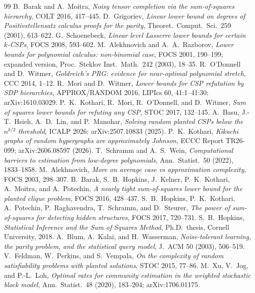 \documentclass[11pt]{article}
\theoremstyle{definition}
\theoremstyle{remark}
\newcommand{\1}{\mathbf 1}
\numberwithin{equation}{section}
\begin{document}
\begin{thebibliography}{99}
 B.~Barak and A.~Moitra, \emph{Noisy tensor completion via the sum-of-squares hierarchy}, COLT 2016, 417--445.
 D.~Grigoriev, \emph{Linear lower bound on degrees of Positivstellensatz calculus proofs for the parity}, Theoret.\ Comput.\ Sci.\ 259 (2001), 613--622.
 G.~Schoenebeck, \emph{Linear level Lasserre lower bounds for certain $k$-CSPs}, FOCS 2008, 593--602.
 M.~Alekhnovich and A.~A.~Razborov, \emph{Lower bounds for polynomial calculus: non-binomial case}, FOCS 2001, 190--199; expanded version, Proc.\ Steklov Inst.\ Math.\ 242 (2003), 18--35.
 R.~O'Donnell and D.~Witmer, \emph{Goldreich's PRG: evidence for near-optimal polynomial stretch}, CCC 2014, 1--12.
 R.~Mori and D.~Witmer, \emph{Lower bounds for CSP refutation by SDP hierarchies}, APPROX/RANDOM 2016, LIPIcs 60, 41:1--41:30; arXiv:1610.03029.
 P.~K.~Kothari, R.~Mori, R.~O'Donnell, and D.~Witmer, \emph{Sum of squares lower bounds for refuting any CSP}, STOC 2017, 132--145.
 A.~Basu, J.-T.~Hsieh, A.~D.~Lin, and P.~Manohar, \emph{Solving random planted CSPs below the $n^{k/2}$ threshold}, ICALP 2026; arXiv:2507.10833 (2025).
 P.~K.~Kothari, \emph{Kikuchi graphs of random hypergraphs are approximately Johnson}, ECCC Report TR26-099; arXiv:2606.08597 (2026).
 T.~Schramm and A.~S.~Wein, \emph{Computational barriers to estimation from low-degree polynomials}, Ann.\ Statist.\ 50 (2022), 1833--1858.
 M.~Alekhnovich, \emph{More on average case vs approximation complexity}, FOCS 2003, 298--307.
 B.~Barak, S.~B.~Hopkins, J.~Kelner, P.~K.~Kothari, A.~Moitra, and A.~Potechin, \emph{A nearly tight sum-of-squares lower bound for the planted clique problem}, FOCS 2016, 428--437.
 S.~B.~Hopkins, P.~K.~Kothari, A.~Potechin, P.~Raghavendra, T.~Schramm, and D.~Steurer, \emph{The power of sum-of-squares for detecting hidden structures}, FOCS 2017, 720--731.
 S.~B.~Hopkins, \emph{Statistical Inference and the Sum of Squares Method}, Ph.D.\ thesis, Cornell University, 2018.
 A.~Blum, A.~Kalai, and H.~Wasserman, \emph{Noise-tolerant learning, the parity problem, and the statistical query model}, J.\ ACM 50 (2003), 506--519.
 V.~Feldman, W.~Perkins, and S.~Vempala, \emph{On the complexity of random satisfiability problems with planted solutions}, STOC 2015, 77--86.
 M.~Xu, V.~Jog, and P.-L.~Loh, \emph{Optimal rates for community estimation in the weighted stochastic block model}, Ann.\ Statist.\ 48 (2020), 183--204; arXiv:1706.01175.

\end{thebibliography}
\end{document}
